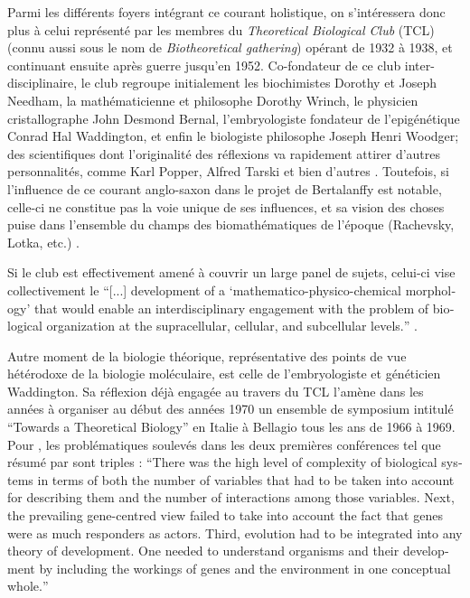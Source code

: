 Parmi les différents foyers intégrant ce courant holistique, on s'intéressera donc plus à celui représenté par les membres du \textit{Theoretical Biological Club} (TCL) (connu aussi sous le nom de \textit{Biotheoretical gathering}) opérant de 1932 à 1938, et continuant ensuite après guerre jusqu'en 1952. Co-fondateur de ce club inter-disciplinaire, le club regroupe initialement les biochimistes Dorothy et Joseph Needham, la mathématicienne et philosophe Dorothy Wrinch, le physicien cristallographe John Desmond Bernal, l'embryologiste fondateur de l'epigénétique Conrad Hal Waddington, et enfin le biologiste philosophe Joseph Henri Woodger; des scientifiques dont l'originalité des réflexions va rapidement attirer d'autres personnalités, comme Karl Popper, Alfred Tarski et bien d'autres \autocite[14-43]{Niemann2014}. Toutefois, si l'influence de ce courant anglo-saxon dans le projet de Bertalanffy est notable, celle-ci ne constitue pas la voie unique de ses influences, et sa vision des choses puise dans l'ensemble du champs des biomathématiques de l'époque (Rachevsky, Lotka, etc.) \autocite[574-585]{Pouvreau2013}.

Si le club est effectivement amené à couvrir un large panel de sujets, celui-ci vise collectivement le \foreignquote{english}{[...] development of a ‘mathematico-physico-chemical morphology’ that would enable an interdisciplinary engagement with the problem of biological organization at the supracellular, cellular, and subcellular levels.} \autocite [277]{Nicholson2013}. 

Autre moment de la biologie théorique, représentative des points de vue hétérodoxe de la biologie moléculaire, est celle de l'embryologiste et généticien Waddington. Sa réflexion déjà engagée au travers du TCL l'amène dans les années à organiser au début des années 1970 un ensemble de symposium intitulé \enquote{Towards a Theoretical Biology} en Italie à Bellagio tous les ans de 1966 à 1969. Pour \textcite[512-513]{Nanjundiah2010}, les problématiques soulevés dans les deux premières conférences tel que résumé par \textcite{Waddington1968} sont triples : \foreignquote{english}{There was the high level of complexity of biological systems in terms of both the number of variables that had to be taken into account for describing them and the number of interactions among those variables. Next, the prevailing gene-centred view failed to take into account the fact that genes were as much responders as actors. Third, evolution had to be integrated into any theory of development. One needed to understand organisms and their development by including the workings of genes and the environment in one conceptual whole.}


